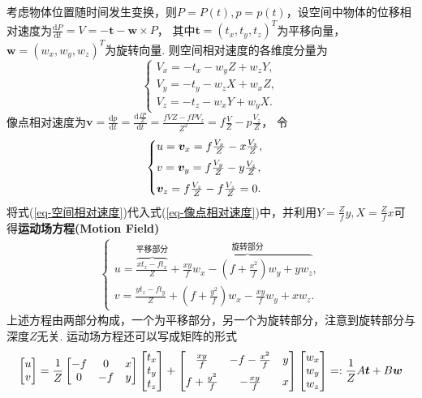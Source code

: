 \documentclass[12pt, a4paper, oneside]{ctexart}
\numberwithin{equation}{section}  %
\theoremstyle{definition}
\def\bd{\boldsymbol}        %
\def\d{\mathrm{d}}          %
\def\add{\vspace{1ex}}      %
\begin{document}
考虑物体位置随时间发生变换，则$P=P(t),p=p(t)$，设空间中物体的位移相对速度为$\frac{\d P}{\d t} = V = -\bd{t}-\bd{w}\times P$，
其中$\bd{t} = (t_x,t_y,t_z)^T$为平移向量，$\bd{w} = (w_x,w_y,w_z)^T$为旋转向量. \add 
则空间相对速度的各维度分量为
\begin{equation}
    \label{eq-空间相对速度}
    \begin{cases}
        V_x = -t_x - w_yZ+w_zY,\\
        V_y = -t_y - w_zX + w_xZ,\\
        V_z = -t_z - w_xY + w_yX.
    \end{cases}
\end{equation}
像点相对速度为$\bd{v} = \frac{\d p}{\d t} = \frac{\d\frac{fP}{Z}}{\d t} = \frac{fVZ-fPV_z}{Z^2} = f\frac{V}{Z}-p\frac{V_z}{Z}$，
令
\begin{equation}
    \label{eq-像点相对速度}
    \begin{cases}
        u = \bd{v}_x = f\frac{V_x}{Z} - x\frac{V_z}{Z},\add\\
        v = \bd{v}_y = f\frac{V_y}{Z} - y\frac{V_z}{Z},\add\\
        \bd{v}_z = f\frac{V_z}{Z} - f\frac{V_z}{Z} = 0.
    \end{cases}
\end{equation}
将式(\ref{eq-空间相对速度})代入式(\ref{eq-像点相对速度})中，并利用$Y = \frac{Z}{f}y,X=\frac{Z}{f}x$可得\textbf{运动场方程(Motion Field)}
\begin{align*}
    \begin{cases}
        u = \overbrace{\frac{xt_z-ft_x}{Z}}^{\text{平移部分}}+\overbrace{\frac{xy}{f}w_x - (f+\frac{x^2}{f})w_y+yw_z}^{\text{旋转部分}},\\
        v = \frac{yt_z-ft_y}{Z}+(f+\frac{y^2}{f})w_x-\frac{xy}{f}w_y+xw_z.
    \end{cases}
\end{align*}
上述方程由两部分构成，一个为平移部分，另一个为旋转部分，注意到旋转部分与深度$Z$无关. 运动场方程还可以写成矩阵的形式
\begin{equation*}
    \begin{bmatrix}
        u\\v
    \end{bmatrix} = \frac{1}{Z}\begin{bmatrix}
        -f&0&x\\0&-f&y
    \end{bmatrix}\begin{bmatrix}
        t_x\\t_y\\t_z
    \end{bmatrix}+\begin{bmatrix}
        \frac{xy}{f}&-f-\frac{x^2}{f}&y\add\\
        f+\frac{y^2}{f}&-\frac{xy}{f}&x
    \end{bmatrix}\begin{bmatrix}
        w_x\\w_y\\w_z
    \end{bmatrix} =: \frac{1}{Z}A\bd{t} + B\bd{w}
\end{equation*}
\end{document}
